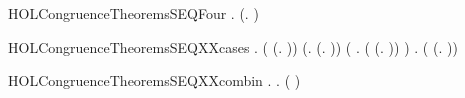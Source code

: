 \newcommand{\HOLCongruenceTheoremsSEQThreea}{\UseVerbatim{HOLCongruenceTheoremsSEQThreea}}
\begin{SaveVerbatim}{HOLCongruenceTheoremsSEQFour}
\HOLTokenTurnstile{} \HOLSymConst{\HOLTokenForall{}} .   \HOLSymConst{\HOLTokenConj{}}   \HOLSymConst{\HOLTokenImp{}}  (\HOLTokenLambda{}.   \HOLSymConst{+}  )
\end{SaveVerbatim}
\newcommand{\HOLCongruenceTheoremsSEQFour}{\UseVerbatim{HOLCongruenceTheoremsSEQFour}}
\begin{SaveVerbatim}{HOLCongruenceTheoremsSEQXXcases}
\HOLTokenTurnstile{} \HOLSymConst{\HOLTokenForall{}}.
         \HOLSymConst{\HOLTokenEquiv{}}
       ( \HOLSymConst{=} (\HOLTokenLambda{}. )) \HOLSymConst{\HOLTokenDisj{}} (\HOLSymConst{\HOLTokenExists{}}.  \HOLSymConst{=} (\HOLTokenLambda{}. )) \HOLSymConst{\HOLTokenDisj{}}
       (\HOLSymConst{\HOLTokenExists{}} . ( \HOLSymConst{=} (\HOLTokenLambda{}.  )) \HOLSymConst{\HOLTokenConj{}}  ) \HOLSymConst{\HOLTokenDisj{}}
       \HOLSymConst{\HOLTokenExists{}} . ( \HOLSymConst{=} (\HOLTokenLambda{}.   \HOLSymConst{+}  )) \HOLSymConst{\HOLTokenConj{}}   \HOLSymConst{\HOLTokenConj{}}  
\end{SaveVerbatim}
\newcommand{\HOLCongruenceTheoremsSEQXXcases}{\UseVerbatim{HOLCongruenceTheoremsSEQXXcases}}
\begin{SaveVerbatim}{HOLCongruenceTheoremsSEQXXcombin}
\HOLTokenTurnstile{} \HOLSymConst{\HOLTokenForall{}}.   \HOLSymConst{\HOLTokenImp{}} \HOLSymConst{\HOLTokenForall{}}.   \HOLSymConst{\HOLTokenImp{}}  ( \HOLConst{\HOLTokenCompose} )
\end{SaveVerbatim}
